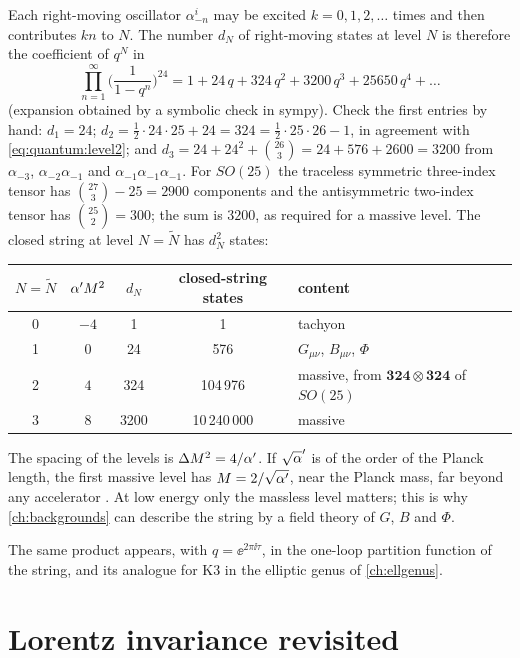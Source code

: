 \begin{example}\label{ex:quantum:counting}
Each right-moving oscillator $\alpha^i_{-n}$ may be excited $k=0,1,2,\dots$ times and then
contributes $kn$ to $N$. The number $d_N$ of right-moving states at level $N$ is therefore
the coefficient of $q^N$ in
\[
 \prod_{n=1}^\infty\Big(\frac{1}{1-q^n}\Big)^{24}=1+24\,q+324\,q^2+3200\,q^3+25650\,q^4+\dots
\]
(expansion obtained by a symbolic check in sympy). Check the first entries by hand:
$d_1=24$; $d_2=\frac12\cdot24\cdot25+24=324=\frac12\cdot25\cdot26-1$, in agreement with
\cref{eq:quantum:level2}; and $d_3=24+24^2+\binom{26}{3}=24+576+2600=3200$ from
$\alpha_{-3}$, $\alpha_{-2}\alpha_{-1}$ and $\alpha_{-1}\alpha_{-1}\alpha_{-1}$. For $SO(25)$
the traceless symmetric three-index tensor has $\binom{27}{3}-25=2900$ components and the
antisymmetric two-index tensor has $\binom{25}{2}=300$; the sum is $3200$, as required for a
massive level. The closed string at level $N=\tilde N$ has $d_N^2$ states:
\begin{center}
\begin{tabular}{@{}ccccl@{}}\toprule
$N=\tilde N$ & $\alpha' M^2$ & $d_N$ & closed-string states & content\\\midrule
0 & $-4$ & 1 & 1 & tachyon\\
1 & $0$ & 24 & 576 & $G_{\mu\nu}$, $B_{\mu\nu}$, $\Phi$\\
2 & $4$ & 324 & 104\,976 & massive, from $\mathbf{324}\otimes\mathbf{324}$ of $SO(25)$\\
3 & $8$ & 3200 & 10\,240\,000 & massive\\\bottomrule
\end{tabular}
\end{center}
The spacing of the levels is $\Delta M^2=4/\alpha'$. If $\sqrt\ap$ is of the order of the Planck
length, the first massive level has $M=2/\sqrt{\alpha'}$, near the Planck mass, far beyond any
accelerator . At low energy only the massless level
matters; this is why \cref{ch:backgrounds} can describe the string by a field theory of
$G$, $B$ and $\Phi$.
\end{example}

The same product appears, with $q=\ee^{2\pi\ii\tau}$, in the one-loop partition function of the
string, and its analogue for K3 in the elliptic genus of \cref{ch:ellgenus}.

\section{Lorentz invariance revisited}\label{sec:quantum:lorentz}

